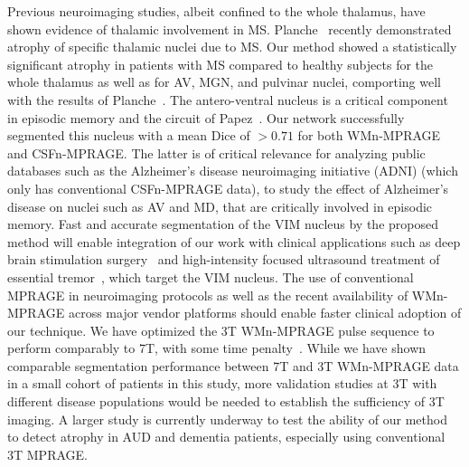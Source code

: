 Previous neuroimaging studies, albeit confined to the whole thalamus, have shown evidence of thalamic involvement in MS\@. Planche~\cite{planche_Whitematternulled_2019} recently demonstrated atrophy of specific thalamic nuclei due to MS\@. Our method showed a statistically significant atrophy in patients with MS compared to healthy subjects for the whole thalamus as well as for AV, MGN, and pulvinar nuclei, comporting well with the results of Planche~\cite{planche_Whitematternulled_2019}. The antero-ventral nucleus is a critical component in episodic memory and the circuit of Papez~\cite{aggleton_Hippocampalanterior_2010}. Our network successfully segmented this nucleus with a mean Dice of $ > 0.71$ for both WMn-MPRAGE and CSFn-MPRAGE\@. The latter is of critical relevance for analyzing public databases such as the Alzheimer's disease neuroimaging initiative (ADNI) (which only has conventional CSFn-MPRAGE data), to study the effect of Alzheimer's disease on nuclei such as AV and MD, that are critically involved in episodic memory. Fast and accurate segmentation of the VIM nucleus by the proposed method will enable integration of our work with clinical applications such as deep brain stimulation surgery~\cite{brodkey_Tremor_2004,benabid_Chronic_1996,fama_Thalamic_2015} and high-intensity focused ultrasound treatment of essential tremor~\cite{elias_Pilot_2013}, which target the VIM nucleus. The use of conventional MPRAGE in neuroimaging protocols as well as the recent availability of WMn-MPRAGE across major vendor platforms should enable faster clinical adoption of our technique. We have optimized the 3T WMn-MPRAGE pulse sequence to perform comparably to 7T, with some time penalty~\cite{saranathan_Optimization_2015}. While we have shown comparable segmentation performance between 7T and 3T WMn-MPRAGE data in a small cohort of patients in this study, more validation studies at 3T with different disease populations would be needed to establish the sufficiency of 3T imaging. A larger study is currently underway to test the ability of our method to detect atrophy in AUD and dementia patients, especially using conventional 3T MPRAGE\@.


